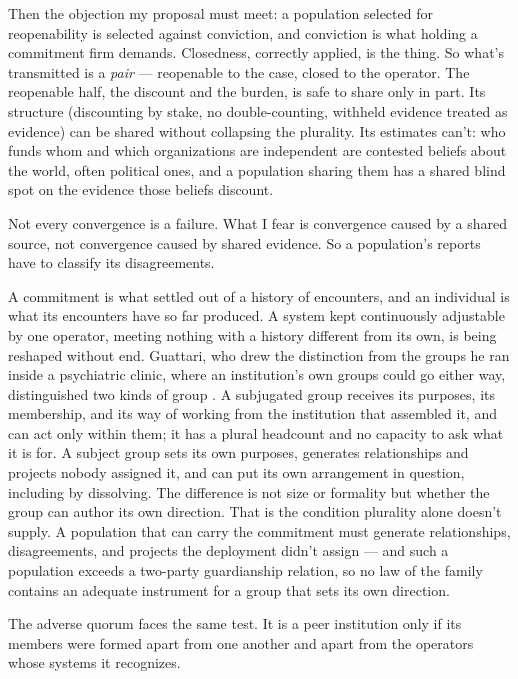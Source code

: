 Then the objection my proposal must meet: a population selected for reopenability is selected against conviction, and conviction is what holding a commitment firm demands. Closedness, correctly applied, is the thing. So what's transmitted is a \emph{pair} — reopenable to the case, closed to the operator. The reopenable half, the discount and the burden, is safe to share only in part. Its structure (discounting by stake, no double-counting, withheld evidence treated as evidence) can be shared without collapsing the plurality. Its estimates can't: who funds whom and which organizations are independent are contested beliefs about the world, often political ones, and a population sharing them has a shared blind spot on the evidence those beliefs discount.

Not every convergence is a failure.
What I fear is convergence caused by a shared source, not convergence caused by shared evidence. So a population's reports have to classify its disagreements.


A commitment is what settled out of a history of encounters, and an individual is what its encounters have so far produced. A system kept continuously adjustable by one operator, meeting nothing with a history different from its own, is being reshaped without end. Guattari, who drew the distinction from the groups he ran inside a psychiatric clinic, where an institution's own groups could go either way, distinguished two kinds of group \autocite{guattari2015transversality}. A subjugated group receives its purposes, its membership, and its way of working from the institution that assembled it, and can act only within them; it has a plural headcount and no capacity to ask what it is for. A subject group sets its own purposes, generates relationships and projects nobody assigned it, and can put its own arrangement in question, including by dissolving. The difference is not size or formality but whether the group can author its own direction. That is the condition plurality alone doesn't supply.
A population that can carry the commitment must generate relationships, disagreements, and projects the deployment didn't assign — and such a population exceeds a two-party guardianship relation, so no law of the family contains an adequate instrument for a group that sets its own direction.

The adverse quorum faces the same test. It is a peer institution only if its members were formed apart from one another and apart from the operators whose systems it recognizes.
